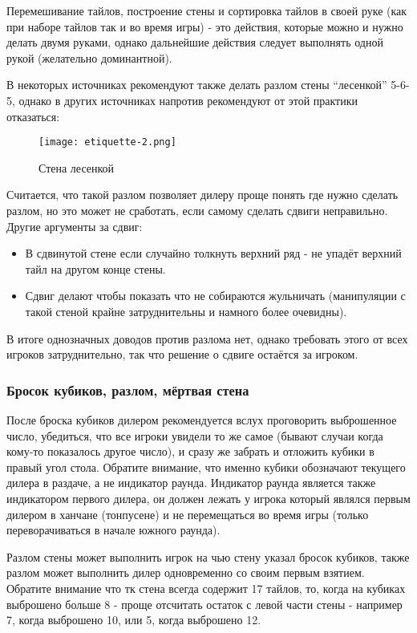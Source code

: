 Перемешивание тайлов, построение стены и сортировка тайлов в своей руке (как при наборе тайлов так и во время игры) - это действия, которые можно и нужно делать двумя руками, однако дальнейшие действия следует выполнять одной рукой (желательно доминантной).

В некоторых источниках рекомендуют также делать разлом стены “лесенкой” 5-6-5, однако в других источниках напротив рекомендуют от этой практики отказаться:

\begin{figure}[H]
	\centering
	\texttt{[image: etiquette-2.png]}
	\caption{Стена лесенкой}
\end{figure}

Считается, что такой разлом позволяет дилеру проще понять где нужно сделать разлом, но это может не сработать, если самому сделать сдвиги неправильно. Другие аргументы за сдвиг:
\begin{itemize}
	\item В сдвинутой стене если случайно толкнуть верхний ряд - не упадёт верхний тайл на другом конце стены.
	\item Сдвиг делают чтобы показать что не собираются жульничать (манипуляции с такой стеной крайне затруднительны и намного более очевидны).
\end{itemize} 
В итоге однозначных доводов против разлома нет, однако требовать этого от всех игроков затруднительно, так что решение о сдвиге остаётся за игроком.

\subsubsection{Бросок кубиков, разлом, мёртвая стена}

После броска кубиков дилером рекомендуется вслух проговорить выброшенное число, убедиться, что все игроки увидели то же самое (бывают случаи когда кому-то показалось другое число), и сразу же забрать и отложить кубики в правый угол стола. Обратите внимание, что именно кубики обозначают текущего дилера в раздаче, а не индикатор раунда. Индикатор раунда является также индикатором первого дилера, он должен лежать у игрока который являлся первым дилером в ханчане (тонпусене) и не перемещаться во время игры (только переворачиваться в начале южного раунда). 

Разлом стены может выполнить игрок на чью стену указал бросок кубиков, также разлом может выполнить дилер одновременно со своим первым взятием. Обратите внимание что тк стена всегда содержит 17 тайлов, то, когда на кубиках выброшено больше 8 - проще отсчитать остаток с левой части стены - например 7, когда выброшено 10, или 5, когда выброшено 12. 

